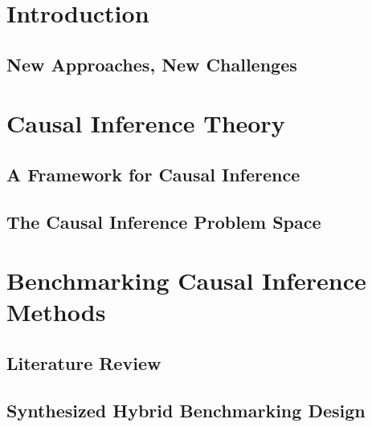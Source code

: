 \documentclass[oneside]{book}
\begin{document}
 
\frontmatter


\clearpage
\thispagestyle{empty}

\tableofcontents
 
\mainmatter
\part{Introduction}
\chapter{New Approaches, New Challenges}



\part{Causal Inference Theory}
\chapter{A Framework for Causal Inference}


\chapter{The Causal Inference Problem Space}



\part{Benchmarking Causal Inference Methods}
\chapter{Literature Review}
\chapter{Synthesized Hybrid Benchmarking Design}

 
\backmatter
 
\end{document}
